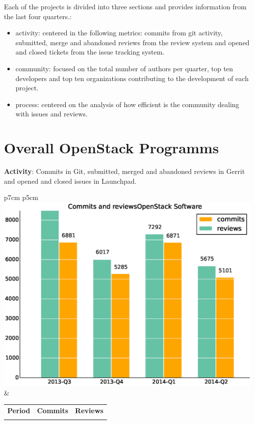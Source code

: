 \documentclass[a4wide,11pt]{report}
\begin{document}
Each of the projects is divided into three sections and provides information from the last four quarters.: 
\begin{itemize}
\item activity: centered in the following metrics: commits from git activity, submitted, merge and abandoned reviews from the review system and
opened and closed tickets from the issue tracking system. 
\item community: focused on the total number of authors per quarter, top ten developers and top ten organizations contributing to the development
of each project.
\item process: centered on the analysis of how efficient is the community dealing with issues and reviews.
\end{itemize}


\section{Overall OpenStack Programms}

\textbf{Activity}: Commits in Git, submitted, merged and abandoned reviews in Gerrit and opened and closed issues in Launchpad.

\begin{tabular}{p{7cm} p{5cm}}
    \vspace{0pt} 
    \includegraphics[scale=.35]{figs/commitsOpenStackSoftware.eps}
    & 
    \vspace{0pt}
    \begin{tabular}{l|r|r|}%
    \bfseries Period & \bfseries Commits & \bfseries Reviews%
    \csvreader[head to column names]{data/commitsOpenStackSoftware.csv}{}%
    {\\ & \commits & \submitted}
    \end{tabular}
\end{tabular}
\end{document}
